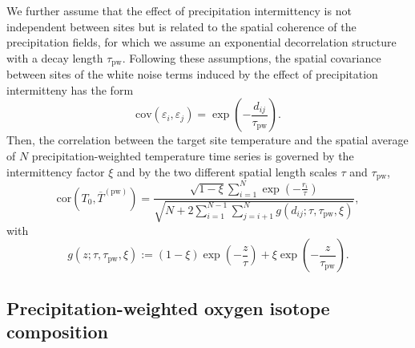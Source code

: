 \documentclass[cp, manuscript]{copernicus}
\begin{document}
We further assume that the effect of precipitation intermittency is not
independent between sites but is related to the spatial coherence of the
precipitation fields, for which we assume an exponential decorrelation structure
with a decay length $\tau_{\mathrm{pw}}$. Following these assumptions, the
spatial covariance between sites of the white noise terms induced by the effect
of precipitation intermitteny has the form
%
\begin{equation}
\label{eq:noise.cov}
\mathrm{cov}(\varepsilon_i,\varepsilon_j)=
\exp{\left(-\frac{d_{ij}}{\tau_{\mathrm{pw}}}\right)}.
\end{equation}
%
Then, the correlation between the target site temperature and the spatial
average of $N$ precipitation-weighted temperature time series is governed by the
intermittency factor $\xi$ and by the two different spatial length scales $\tau$
and $\tau_{\mathrm{pw}}$,
%
\begin{equation}
\label{eq:t2m.pw.corr}
\mathrm{cor}\left(T_0,\overline{T}^{\mathrm{(pw)}}\right)=
\frac
{\sqrt{1-\xi}\sum_{i=1}^{N}\exp{\left(-\frac{r_i}{\tau}\right)}}
{\sqrt{N + 2\sum_{i=1}^{N-1}\sum_{j=i+1}^{N}
  g(d_{ij}; \tau, \tau_{\mathrm{pw}}, \xi)}},
\end{equation}
%
with
\begin{equation}
\label{eq:exp.fun}
g(z; \tau, \tau_{\mathrm{pw}}, \xi):=
(1-\xi)\exp{\left(-\frac{z}{\tau}\right)} +
\xi\exp{\left(-\frac{z}{\tau_{\mathrm{pw}}}\right)}.
\end{equation}

\subsection{Precipitation-weighted oxygen isotope composition}
\label{app:concept.model.oxy.pw}
\end{document}
